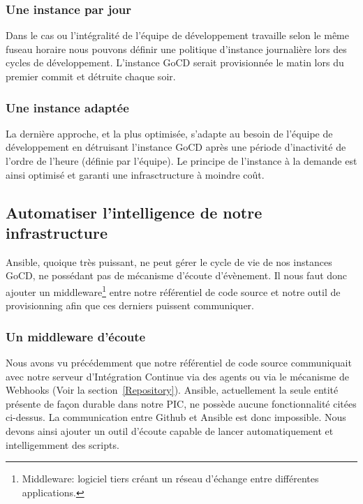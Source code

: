           \subsubsection{Une instance par jour}
          Dans le cas ou l'intégralité de l'équipe de développement travaille selon le même fuseau horaire nous pouvons définir une politique d'instance journalière lors des cycles de développement. L'instance GoCD serait provisionnée le matin lors du premier commit et détruite chaque soir.

          \subsubsection{Une instance adaptée}
          La dernière approche, et la plus optimisée, s'adapte au besoin de l'équipe de développement en détruisant l'instance GoCD après une période d'inactivité de l'ordre de l'heure (définie par l'équipe). Le principe de l'instance à la demande est ainsi optimisé et garanti une infrasctructure à moindre coût.

        \subsection{Automatiser l'intelligence de notre infrastructure}
        Ansible, quoique très puissant, ne peut gérer le cycle de vie de nos instances GoCD, ne possédant pas de mécanisme d'écoute d'évènement. Il nous faut donc ajouter un middleware\footnote{Middleware: logiciel tiers créant un réseau d'échange entre différentes applications.} entre notre référentiel de code source et notre outil de provisionning afin que ces derniers puissent communiquer.\\

          \subsubsection{Un middleware d'écoute}
          Nous avons vu précédemment que notre référentiel de code source communiquait avec notre serveur d'Intégration Continue via des agents ou via le mécanisme de Webhooks (Voir la section~\ref{Repository}). Ansible, actuellement la seule entité présente de façon durable dans notre PIC, ne possède aucune fonctionnalité citées ci-dessus. La communication entre Github et Ansible est donc impossible. Nous devons ainsi ajouter un outil d'écoute capable de lancer automatiquement et intelligemment des scripts.\\

